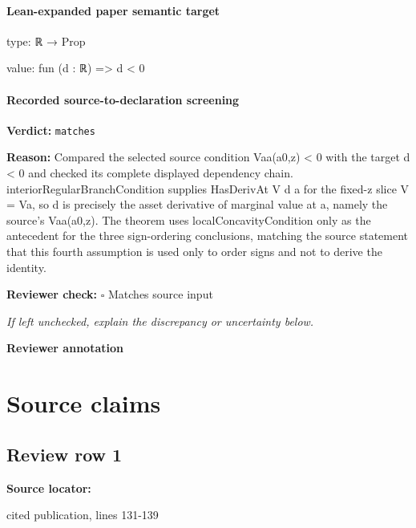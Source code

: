 \documentclass[10pt]{article}
\newcommand{\reviewerbox}{%
  \par\noindent\fbox{\parbox{0.96\linewidth}{\rule{0pt}{0.38in}}}\par
}
\newcommand{\reviewmatch}[1]{%
  \par\noindent\textbf{Reviewer check:} $\square$\; #1\par
  \noindent\emph{If left unchecked, explain the discrepancy or uncertainty below.}\par
}
\begin{document}
\paragraph{Lean-expanded paper semantic target}
\begin{ReviewVerbatim}
type:
ℝ → Prop

value:
fun (d : ℝ) => d < 0
\end{ReviewVerbatim}


\paragraph{Recorded source-to-declaration screening}
\textbf{Verdict:} \texttt{matches}
\\
{\raggedright
\textbf{Reason:} Compared the selected source condition Vaa(a0,z) < 0 with the target d < 0 and checked its complete displayed dependency chain.\allowbreak{} interiorRegularBranchCondition supplies HasDerivAt V d a for the fixed-\allowbreak{}z slice V = Va, so d is precisely the asset derivative of marginal value at a, namely the source's Vaa(a0,z).\allowbreak{} The theorem uses localConcavityCondition only as the antecedent for the three sign-\allowbreak{}ordering conclusions, matching the source statement that this fourth assumption is used only to order signs and not to derive the identity.\allowbreak{}
\par}
\reviewmatch{Matches source input}
\noindent\textbf{Reviewer annotation}\par
\reviewerbox

\clearpage
\hypertarget{source-claim-5daf04b3ba9ef8c8}{}
\hypertarget{source-section-f10b5f68e4acf3dc}{}
\section*{Source claims}
\subsection*{Review row 1}
\textbf{Source locator:} {\footnotesize\raggedright cited publication, lines 131-\allowbreak{}139\par}
\end{document}
